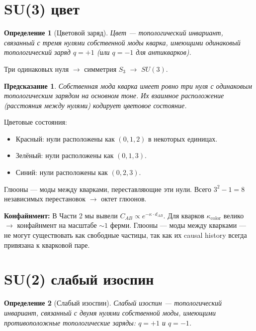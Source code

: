 \documentclass[11pt,a4paper]{article}
\newtheorem{definition}{Определение}[section]
\newtheorem{prediction}{Предсказание}[section]
\theoremstyle{definition}
\begin{document}
\section{SU(3) цвет}

\begin{definition}[Цветовой заряд]
Цвет — топологический инвариант, связанный с тремя нулями собственной моды кварка, имеющими одинаковый топологический заряд $q = +1$ (или $q = -1$ для антикварков).
\end{definition}

Три одинаковых нуля $\to$ симметрия $S_3$ $\to$ $SU(3)$.

\begin{prediction}
Собственная мода кварка имеет ровно три нуля с одинаковым топологическим зарядом на основном тоне. Их взаимное расположение (расстояния между нулями) кодирует цветовое состояние.
\end{prediction}

Цветовые состояния:
\begin{itemize}
    \item Красный: нули расположены как $(0, 1, 2)$ в некоторых единицах.
    \item Зелёный: нули расположены как $(0, 1, 3)$.
    \item Синий: нули расположены как $(0, 2, 3)$.
\end{itemize}

Глюоны — моды между кварками, переставляющие эти нули. Всего $3^2 - 1 = 8$ независимых перестановок $\to$ октет глюонов.

\textbf{Конфайнмент:} В Части 2 мы вывели $C_{AB} \propto e^{-\kappa \cdot d_{AB}}$. Для кварков $\kappa_{\text{color}}$ велико $\to$ конфайнмент на масштабе $\sim 1$ ферми. Глюоны — моды между кварками — не могут существовать как свободные частицы, так как их causal history всегда привязана к кварковой паре.

\section{SU(2) слабый изоспин}

\begin{definition}[Слабый изоспин]
Слабый изоспин — топологический инвариант, связанный с двумя нулями собственной моды, имеющими противоположные топологические заряды: $q = +1$ и $q = -1$.
\end{definition}
\end{document}
